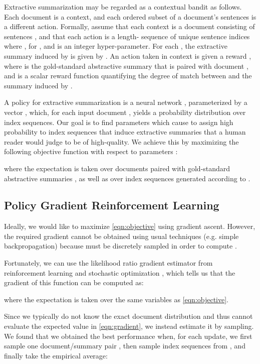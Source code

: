 \documentclass[11pt,a4paper]{article}
\begin{document}
Extractive summarization may be regarded as a contextual bandit as follows. Each document is a context, and each ordered subset of a document's sentences is a different action. Formally, assume that each context is a document  consisting of sentences , and that each action is a length- sequence of unique sentence indices  where ,  for , and  is an integer hyper-parameter. For each , the extractive summary induced by  is given by . An action  taken in context  is given a reward , where  is the gold-standard abstractive summary that is paired with document , and  is a scalar reward function quantifying the degree of match between  and the summary induced by .

A policy for extractive summarization is a neural network , parameterized by a vector , which, for each input document , yields a probability distribution over index sequences. Our goal is to find parameters  which cause  to assign high probability to index sequences that induce extractive summaries that a human reader would judge to be of high-quality. We achieve this by maximizing the following objective function with respect to parameters :

where the expectation is taken over documents  paired with gold-standard abstractive summaries , as well as over index sequences  generated according to .

\subsection{Policy Gradient Reinforcement Learning}
Ideally, we would like to maximize \eqref{eqn:objective} using gradient ascent. However, the required gradient cannot be obtained using usual techniques (e.g. simple backpropagation) because  must be discretely sampled in order to compute .

Fortunately, we can use the likelihood ratio gradient estimator from reinforcement learning and stochastic optimization \cite{williams1992simple, sutton2000policy}, which tells us that the gradient of this function can be computed as:

where the expectation is taken over the same variables as \eqref{eqn:objective}.

Since we typically do not know the exact document distribution and thus cannot evaluate the expected value in \eqref{eqn:gradient}, we instead estimate it by sampling. We found that we obtained the best performance when, for each update, we first sample one document/summary pair , then sample  index sequences  from , and finally take the empirical average:
\end{document}
